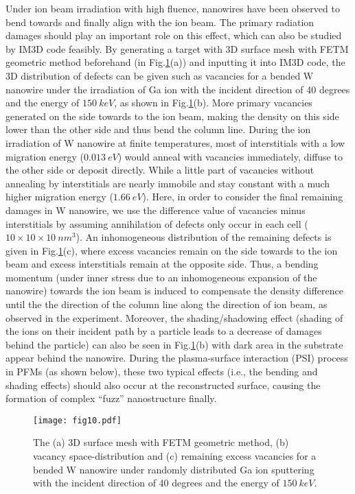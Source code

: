 Under ion beam irradiation with high fluence, nanowires have been observed to bend towards and finally align with the ion beam\cite{Cui:2013}. The primary radiation damages should play an important role on this effect, which can also be studied by IM3D code feasibly. By generating a target with 3D surface mesh with FETM geometric method beforehand (in Fig.\ref{Fig.10}(a)) and inputting it into IM3D code, the 3D distribution of defects can be given such as vacancies for a bended W nanowire under the irradiation of Ga ion with the incident direction of 40 degrees and the energy of $150~keV$, as shown in Fig.\ref{Fig.10}(b). More primary vacancies generated on the side towards to the ion beam, making the density on this side lower than the other side and thus bend the column line. During the ion irradiation of W nanowire at finite temperatures, most of interstitials with a low migration energy ($0.013~eV$\cite{Derlet:2007}) would anneal with vacancies immediately, diffuse to the other side or deposit directly. While a little part of vacancies without annealing by interstitials are nearly immobile and stay constant with a much higher migration energy ($1.66~eV$\cite{Becquart:2007}). Here, in order to consider the final remaining damages in W nanowire, we use the difference value of vacancies minus interstitials by assuming annihilation of defects only occur in each cell ($10 \times 10 \times 10~nm^3$). An inhomogeneous distribution of the remaining defects is given in Fig.\ref{Fig.10}(c), where excess vacancies remain on the side towards to the ion beam and excess interstitials remain at the opposite side. Thus, a bending momentum (under inner stress due to an inhomogeneous expansion of the nanowire) towards the ion beam is induced to compensate the density difference until the the direction of the column line along the direction of ion beam, as observed in the experiment\cite{Cui:2013}. Moreover, the shading/shadowing effect (shading of the ions on their incident path by a particle leads to a decrease of damages behind the particle) can also be seen in Fig.\ref{Fig.10}(b) with dark area in the substrate appear behind the nanowire. During the plasma-surface interaction (PSI) process in PFMs (as shown below), these two typical effects (i.e., the bending and shading effects) should also occur at the reconstructed surface, causing the formation of complex ``fuzz'' nanostructure finally.

\begin{figure}[!ht]\centering
\texttt{[image: fig10.pdf]}
\caption{The (a) 3D surface mesh with FETM geometric method, (b) vacancy space-distribution and (c) remaining excess vacancies for a bended W nanowire under randomly distributed Ga ion sputtering with the incident direction of 40 degrees and the energy of $150~keV$.} \label{Fig.10}
\end{figure}


